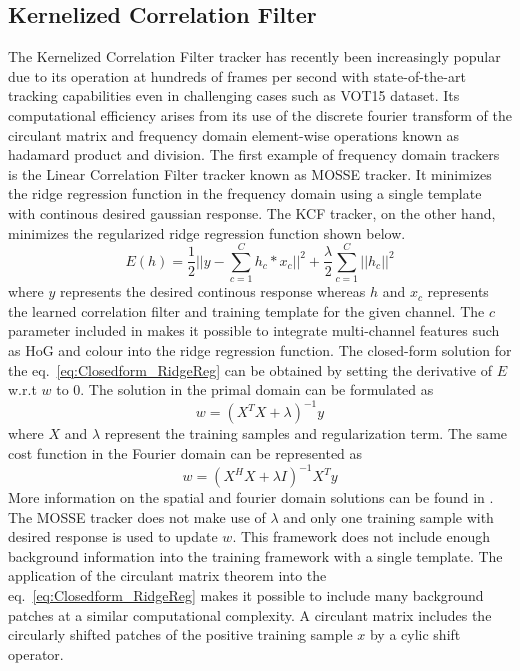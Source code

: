 \documentclass{bmvc2k}
\begin{document}
\subsection{Kernelized Correlation Filter} \label{sec:kcf}
The Kernelized Correlation Filter tracker has recently been
increasingly popular due to its operation at hundreds of frames per
second with state-of-the-art tracking capabilities even in challenging
cases such as VOT15 dataset. Its computational efficiency arises from
its use of the discrete fourier transform of the circulant matrix and
frequency domain element-wise operations known as hadamard product and
division. The first example of frequency domain trackers is the Linear
Correlation Filter tracker known as MOSSE tracker. It minimizes the
ridge regression function in the frequency domain using a single
template with continous desired gaussian response. The KCF tracker, on
the other hand, minimizes the regularized ridge regression function
shown below.
\begin{equation}
E(h) = \frac{1}{2}||y-\sum_{c=1}^{C}h_{c}*x_{c}||^{2} + \frac{\lambda}{2}\sum_{c=1}^{C}||h_{c}||^{2}
\label{eq:Closedform_RidgeReg}
\end{equation}
where $y$ represents the desired continous response whereas $h$ and
$x_{c}$ represents the learned correlation filter and training
template for the given channel. The $c$ parameter included in
\cite{henriques2015high,galoogahi2013multi} makes it possible to
integrate multi-channel features such as HoG and colour into the ridge
regression function. The closed-form solution for the
eq.~\ref{eq:Closedform_RidgeReg} can be obtained by setting the
derivative of $E$ w.r.t $w$ to $0$. The solution in the primal domain
can be formulated as
\begin{equation}
w = (X^{T}X+\lambda)^{-1}y
\label{eq:SpatialSolution}
\end{equation}
where $X$ and $\lambda$ represent the training samples and
regularization term. The same cost function in the Fourier domain can
be represented as
\begin{equation}
w = (X^{H}X+\lambda I)^{-1}X^{T}y
\label{eq:FourierSolution}
\end{equation}
More information on the spatial and fourier domain solutions can be
found in \cite{henriques2015high}. The MOSSE tracker does not make use
of $\lambda$ and only one training sample with desired response is
used to update $w$. This framework does not include enough background
information into the training framework with a single template. The
application of the circulant matrix theorem into the
eq.~\ref{eq:Closedform_RidgeReg} makes it possible to include many
background patches at a similar computational complexity. A circulant
matrix includes the circularly shifted patches of the positive
training sample $x$ by a cylic shift operator. 
\end{document}
